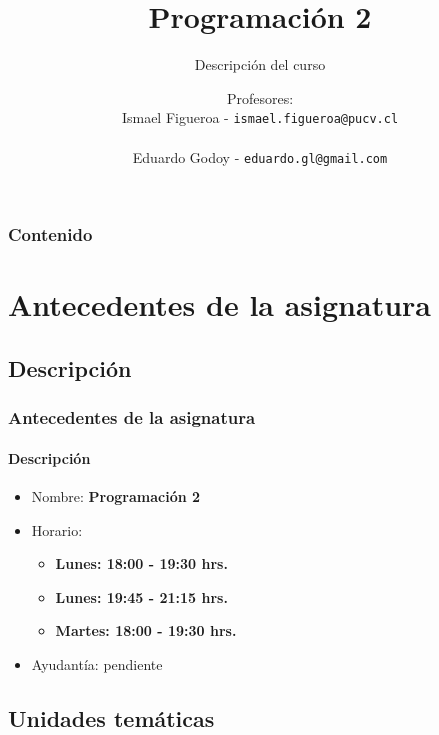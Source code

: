 \documentclass{beamer}
\title[\textbf{Programaci\'on 2}]{\textbf{Programaci\'on 2}}
\subtitle{Descripci\'on del curso}
\author[IF-EG]
{Profesores:\\
	Ismael Figueroa -  \texttt{\small ismael.figueroa@pucv.cl} \\
	\vspace{0.5mm}
	 \\
	 Eduardo Godoy - \texttt{\small eduardo.gl@gmail.com} \\
}
\institute[Universidad de Valpara\'iso]
\begin{document}
	\begin{frame}
		\titlepage
	\end{frame}

	\begin{frame}
		\frametitle{Contenido}
		\tableofcontents%
	\end{frame}

	\section{Antecedentes de la asignatura}

		\subsection{Descripci\'on}

		\begin{frame}
			\frametitle{Antecedentes de la asignatura}
			\framesubtitle{Descripci\'on}

			\begin{itemize}
				\item Nombre: \textbf{Programaci\'on 2}
				\item Horario:
				\begin{itemize}
					\item \textbf{Lunes: 18:00 - 19:30 hrs.}
					\item \textbf{Lunes: 19:45 - 21:15 hrs.}
					\item \textbf{Martes: 18:00 - 19:30 hrs.}
				\end{itemize}
				\item Ayudant\'ia: pendiente
			\end{itemize}
		\end{frame}

		\subsection{Unidades tem\'aticas}
\end{document}
